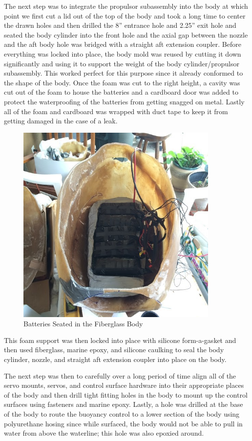 \documentclass{report}
\begin{document}
The next step was to integrate the propulsor subassembly into the body at which point we first cut a lid out of the top of the body and took a long time to center the drawn holes and then drilled the 8” entrance hole and 2.25” exit hole and seated the body cylinder into the front hole and the axial gap between the nozzle and the aft body hole was bridged with a straight aft extension coupler.  Before everything was locked into place, the body mold was reused by cutting it down significantly and using it to support the weight of the body cylinder/propulsor subassembly.  This worked perfect for this purpose since it already conformed to the shape of the body.  Once the foam was cut to the right height, a cavity was cut out of the foam to house the batteries and a cardboard door was added to protect the waterproofing of the batteries from getting snagged on metal.  Lastly all of the foam and cardboard was wrapped with duct tape to keep it from getting damaged in the case of a leak.
\begin{figure}[H]
\centering
\includegraphics[width=10cm]{openFglass}
\caption{Batteries Seated in the Fiberglass Body}
\end{figure}
This foam support was then locked into place with silicone form-a-gasket and then used fiberglass, marine epoxy, and silicone caulking to seal the body cylinder, nozzle, and straight aft extension coupler into place on the body.\par
The next step was then to carefully over a long period of time align all of the servo mounts, servos, and control surface hardware into their appropriate places of the body and then drill tight fitting holes in the body to mount up the control surfaces using fasteners and marine epoxy.  Lastly, a hole was drilled at the base of the body to route the buoyancy control to a lower section of the body using polyurethane hosing since while surfaced, the body would not be able to pull in water from above the waterline; this hole was also epoxied around.
\end{document}

